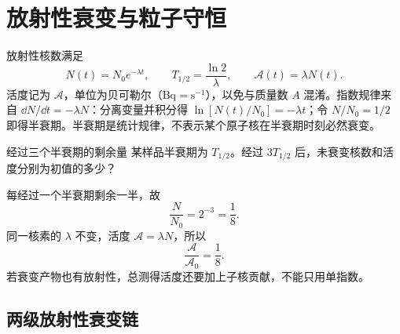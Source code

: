 \section{放射性衰变与粒子守恒}

放射性核数满足
\begin{equation}
 N(t)=N_0e^{-\lambda t},\qquad
 T_{1/2}=\frac{\ln2}{\lambda},\qquad
 \mathcal A(t)=\lambda N(t).
\end{equation}
活度记为 $\mathcal A$，单位为贝可勒尔（$\mathrm{Bq}=\mathrm{s^{-1}}$），以免与质量数 $A$ 混淆。指数规律来自 $\dd N/\dd t=-\lambda N$：分离变量并积分得 $\ln[N(t)/N_0]=-\lambda t$；令 $N/N_0=1/2$ 即得半衰期。半衰期是统计规律，不表示某个原子核在半衰期时刻必然衰变。

\begin{origexamplebox}{经过三个半衰期的剩余量}
某样品半衰期为 $T_{1/2}$。经过 $3T_{1/2}$ 后，未衰变核数和活度分别为初值的多少？
\end{origexamplebox}
\begin{xesolution}
每经过一个半衰期剩余一半，故
\[
 \boxed{\frac N{N_0}=2^{-3}=\frac18}.
\]
同一核素的 $\lambda$ 不变，活度 $\mathcal A=\lambda N$，所以
\[
 \boxed{\frac{\mathcal A}{\mathcal A_0}=\frac18}.
\]
若衰变产物也有放射性，总测得活度还要加上子核贡献，不能只用单指数。
\end{xesolution}



\subsection{两级放射性衰变链}

